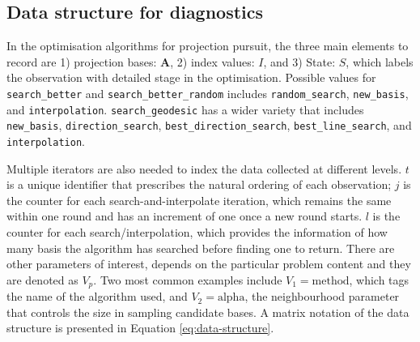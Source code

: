 \documentclass[12pt]{article}
\begin{document}
\hypertarget{data-structure-for-diagnostics}{%
\subsection{Data structure for diagnostics}\label{data-structure-for-diagnostics}}

In the optimisation algorithms for projection pursuit, the three main elements to record are 1) projection bases: \(\mathbf{A}\), 2) index values: \(I\), and 3) State: \(S\), which labels the observation with detailed stage in the optimisation. Possible values for \texttt{search\_better} and \texttt{search\_better\_random} includes \texttt{random\_search}, \texttt{new\_basis}, and \texttt{interpolation}. \texttt{search\_geodesic} has a wider variety that includes \texttt{new\_basis}, \texttt{direction\_search}, \texttt{best\_direction\_search}, \texttt{best\_line\_search}, and \texttt{interpolation}.

Multiple iterators are also needed to index the data collected at different levels. \(t\) is a unique identifier that prescribes the natural ordering of each observation; \(j\) is the counter for each search-and-interpolate iteration, which remains the same within one round and has an increment of one once a new round starts. \(l\) is the counter for each search/interpolation, which provides the information of how many basis the algorithm has searched before finding one to return. There are other parameters of interest, depends on the particular problem content and they are denoted as \emph{\(V_{p}\)}. Two most common examples include \(V_1 = \text{method}\), which tags the name of the algorithm used, and \(V_2 = \text{alpha}\), the neighbourhood parameter that controls the size in sampling candidate bases. A matrix notation of the data structure is presented in Equation \ref{eq:data-structure}.
\end{document}
